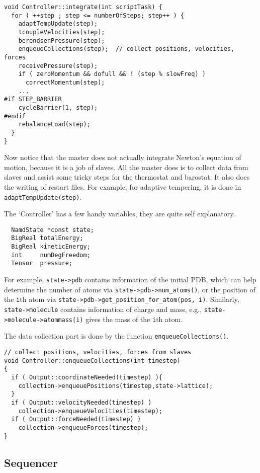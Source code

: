 \documentclass{article}
\begin{document}
\begin{lstlisting}
void Controller::integrate(int scriptTask) {
  for ( ++step ; step <= numberOfSteps; step++ ) {
    adaptTempUpdate(step);
    tcoupleVelocities(step);
    berendsenPressure(step);
    enqueueCollections(step);  // collect positions, velocities, forces
    receivePressure(step);
    if ( zeroMomentum && dofull && ! (step % slowFreq) )
      correctMomentum(step);
    ...
#if STEP_BARRIER
    cycleBarrier(1, step);
#endif
    rebalanceLoad(step);
  }
}
\end{lstlisting}
%
Now notice that the master does not actually
integrate Newton's equation of motion,
because it is a job of slaves.
%
All the master does is to collect data from slaves
and assist some tricky steps for the thermostat and barostat.
%
It also does the writing of restart files.
%
For example, for adaptive tempering,
it is done in \texttt{adaptTempUpdate(step)}.

The `Controller' has a few handy variables,
they are quite self explanatory.
\begin{lstlisting}
  NamdState *const state;
  BigReal totalEnergy;
  BigReal kineticEnergy;
  int     numDegFreedom;
  Tensor  pressure;
\end{lstlisting}
%
For example, \texttt{state->pdb} contains information
of the initial PDB, which can help determine the number of atoms
via \texttt{state->pdb->num\_atoms()}, or the position of the \texttt{i}th atom
via \texttt{state->pdb->get\_position\_for\_atom(pos, i)}.
Similarly, \texttt{state->molecule} contains information of charge and mass,
e.g., \texttt{state->molecule->atommass(i)} gives the mass
of the \texttt{i}th atom.

The data collection part is done by the function
\texttt{enqueueCollections()}.

\begin{lstlisting}
// collect positions, velocities, forces from slaves
void Controller::enqueueCollections(int timestep)
{
  if ( Output::coordinateNeeded(timestep) ){
    collection->enqueuePositions(timestep,state->lattice);
  }
  if ( Output::velocityNeeded(timestep) )
    collection->enqueueVelocities(timestep);
  if ( Output::forceNeeded(timestep) )
    collection->enqueueForces(timestep);
}
\end{lstlisting}


\subsection{Sequencer}
\end{document}
